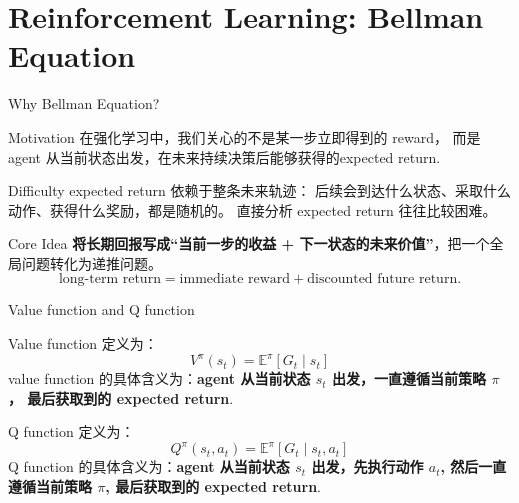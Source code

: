 \documentclass[aspectratio=169]{beamer}
\begin{document}
\section{Reinforcement Learning: Bellman Equation}

\begin{frame}{Why Bellman Equation?}
    \begin{block}{Motivation}
        在强化学习中，我们关心的不是某一步立即得到的 reward，
        而是 agent 从当前状态出发，在未来持续决策后能够获得的expected return.
    \end{block}
    \begin{block}{Difficulty}
        expected return 依赖于整条未来轨迹：
        后续会到达什么状态、采取什么动作、获得什么奖励，都是随机的。
        直接分析 expected return 往往比较困难。
    \end{block}
    \begin{block}{Core Idea}
        \textbf{将长期回报写成“当前一步的收益 + 下一状态的未来价值”}，把一个全局问题转化为递推问题。
        \begin{equation}
            \text{long-term return} = \text{immediate reward} + \text{discounted future return}.
        \end{equation}
    \end{block}
\end{frame}

\begin{frame}{Value function and Q function}
\begin{definition}
    Value function 定义为：
        \begin{equation}
            V^{\pi}(s_t) = \mathbb{E}^{\pi}[G_t\mid s_t]
        \end{equation}
        value function 的具体含义为：\textbf{agent 从当前状态 $s_t$ 出发，一直遵循当前策略 $\pi$， 最后获取到的 expected return}.
\end{definition}

\begin{definition}[Q function]
    Q function 定义为：
    \begin{equation}
        Q^{\pi}(s_t,a_t) = \mathbb{E}^{\pi}[G_t\mid s_t , a_t]
    \end{equation}
    Q function 的具体含义为：\textbf{agent 从当前状态 $s_t$ 出发，先执行动作 $a_t$, 然后一直遵循当前策略 $\pi$, 最后获取到的 expected return}.
\end{definition}

\end{frame}
\end{document}
